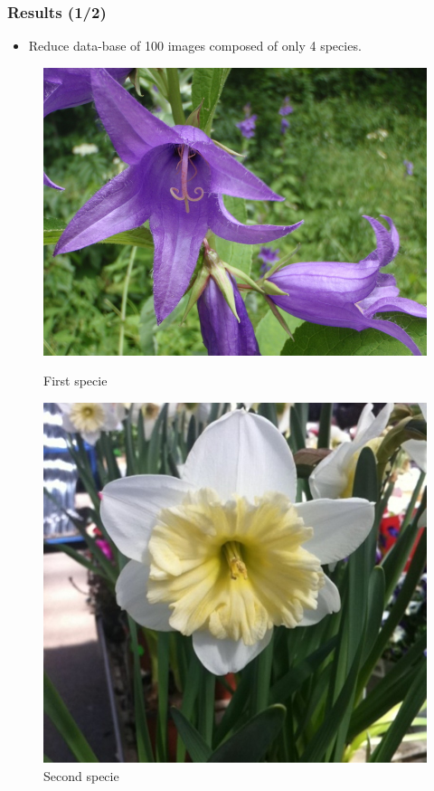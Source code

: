 \documentclass[xcolor=table]{beamer}
\begin{document}
\begin{frame} \frametitle{Results (1/2)}

\begin{itemize}
    \item Reduce data-base of 100 images composed of only 4 species.
\end{itemize}

  \begin{figure}[htbp]
    \begin{minipage}[c]{.45\linewidth}
      \begin{center}
	\includegraphics[scale=0.40]{63.jpg}
	\caption{First specie}
	\label{fig:image4}
      \end{center}
    \end{minipage}
    \hfill
    \begin{minipage}[c]{.45\linewidth}
      \begin{center}
	\includegraphics[scale=0.08]{2391.jpg}
	\caption{Second specie}
	\label{fig:image5}
      \end{center}
    \end{minipage}
  \end{figure}



\end{frame}
\end{document}

